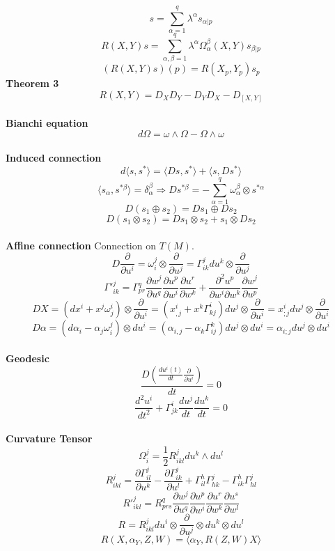 \documentclass{article}
\begin{document}
\[s = \sum_{\alpha=1}^{q} \lambda^{\alpha} s_{\alpha|p}\]
\[R(X,Y)s = \sum_{\alpha,\beta=1}^{q} \lambda^{\alpha} \Omega^{\beta}_{\alpha}(X,Y)s_{\beta|p}\]
\[(R(X,Y)s)(p) = R(X_p,Y_p)s_p\]
\textbf{Theorem 3}\\
\[R(X,Y) = D_X D_Y - D_Y D_X -D_{[X,Y]}\]\\
\textbf{Bianchi equation}\\
\[d\Omega = \omega \wedge \Omega - \Omega \wedge \omega\]\\
\textbf{Induced connection}\\
\[d\langle s,s^* \rangle = \langle Ds,s^* \rangle + \langle s,Ds^* \rangle\]
\[\langle s_{\alpha},s^{*\beta} \rangle  = \delta^{\beta}_{\alpha}  \Rightarrow Ds^{*\beta} = -\sum_{\alpha=1}^{q} \omega^{\beta}_{\alpha} \otimes s^{*\alpha}\]
\[D(s_1 \oplus s_2) = Ds_1 \oplus Ds_2\]
\[D(s_1 \otimes s_2) = Ds_1 \otimes s_2 + s_1 \otimes Ds_2\]\\
\textbf{Affine connection} Connection on $T(M)$.\\
\[D\frac{\partial}{\partial u^i} = \omega^j_i \otimes \frac{\partial}{\partial u^j} = \Gamma^{j}_{ik} du^k \otimes \frac{\partial}{\partial u^j}\]
\[\Gamma'^{j}_{ik} = \Gamma^{q}_{pr} \frac{\partial w^j}{\partial u^q} \frac{\partial u^p}{\partial w^i} \frac{\partial u^r}{\partial w^k} + \frac{\partial^2 u^p}{\partial w^i \partial w^k} \frac{\partial w^j}{\partial u^p}\]
\[DX = (dx^i + x^j \omega^i_j)\otimes \frac{\partial}{\partial u^i} = (x^i_{,j} + x^k \Gamma^{i}_{kj}) du^j \otimes \frac{\partial}{\partial u^i} = x^i_{;j}du^j \otimes \frac{\partial}{\partial u^i} \]
\[D \alpha = (d\alpha_i - \alpha_j \omega^j_i)\otimes du^i = (\alpha_{i,j} -\alpha_k \Gamma^k_{ij})du^j \otimes du^i = \alpha_{i;j} du^j \otimes du^i \]\\
\textbf{Geodesic}
\[\frac{D(\frac{du^i(t)}{dt} \frac{\partial}{\partial u^i})}{dt} = 0 \]
\[\frac{d^2 u^i}{dt^2} + \Gamma^i_{jk} \frac{du^j}{dt} \frac{du^k}{dt} = 0\]\\
\textbf{Curvature Tensor}\\
\[\Omega^j_i = \frac{1}{2}R^j_{ikl} du^k \wedge du^l \]
\[R^j_{ikl} = \frac{\partial \Gamma^j_{il}}{\partial u^k} - \frac{\partial \Gamma^j_{ik}}{\partial u^l} + \Gamma^h_{il} \Gamma^j_{hk} - \Gamma^h_{ik} \Gamma^j_{hl}\]
\[R'^j_{ikl} = R^q_{prs} \frac{\partial w^j}{\partial u^q} \frac{\partial u^p}{\partial w^i} \frac{\partial u^r}{\partial w^k}\frac{\partial u^s}{\partial w^l}\]
\[R = R^{j}_{ikl} du^{i} \otimes \frac{\partial}{\partial u^j} \otimes du^{k} \otimes du^{l}\]
\[R(X,\alpha_Y,Z,W)= \langle \alpha_Y,R(Z,W)X \rangle\]
\end{document}
